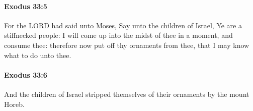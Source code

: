 		\paragraph{Exodus 33:5} %
			\label{EXODUS-33-5}

			For the LORD had said unto Moses, Say unto the children of Israel, Ye are a stiffnecked people: I will come up into the midst of thee in a moment, and consume thee: therefore now put off thy ornaments from thee, that I may know what to do unto thee.


		\paragraph{Exodus 33:6} %
			\label{EXODUS-33-6}

			And the children of Israel stripped themselves of their ornaments by the mount Horeb.


